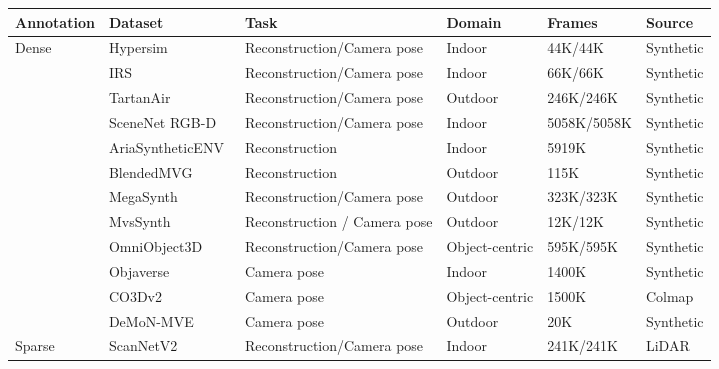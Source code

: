 \begin{table}[htbp]
  \centering
  \small
  \renewcommand{\arraystretch}{0.88}
  \setlength{\tabcolsep}{6pt}
    \begin{tabular}{l|l|l|l|l|l}
      \toprule
      Annotation & Dataset & Task & Domain & Frames & Source \\
      \midrule
      \multirow{12}{*}{Dense}
        & Hypersim~\cite{roberts2021hypersimphotorealisticsyntheticdataset}        & Reconstruction/Camera pose & Indoor  & 44K/44K  & Synthetic  \\
        & IRS~\cite{wang2021irslargenaturalisticindoor}             & Reconstruction/Camera pose & Indoor  & 66K/66K & Synthetic \\
        & TartanAir~\cite{wang2020tartanairdatasetpushlimits}       & Reconstruction/Camera pose & Outdoor  & 246K/246K  & Synthetic \\
        & SceneNet RGB-D~\cite{mccormac2017scenenetrgbd5mphotorealistic}  & Reconstruction/Camera pose & Indoor  & 5058K/5058K & Synthetic  \\
        & AriaSyntheticENV~\cite{avetisyan2024scenescriptreconstructingscenesautoregressive} & Reconstruction            & Indoor  & 5919K & Synthetic  \\
        & BlendedMVG~\cite{yao2020blendedmvslargescaledatasetgeneralized}      & Reconstruction             & Outdoor  & 115K & Synthetic \\
        & MegaSynth~\cite{jiang2025megasynthscaling3dscene}       & Reconstruction/Camera pose & Outdoor  & 323K/323K & Synthetic \\
        & MvsSynth~\cite{DeepMVS}        & Reconstruction / Camera pose & Outdoor  & 12K/12K & Synthetic \\
        & OmniObject3D~\cite{wu2023omniobject3dlargevocabulary3dobject}      & Reconstruction/Camera pose & Object-centric  & 595K/595K  & Synthetic \\
        & Objaverse~\cite{deitke2022objaverseuniverseannotated3d}       & Camera pose       & Indoor  & 1400K  & Synthetic \\
        & CO3Dv2~\cite{reizenstein2021commonobjects3dlargescale}          & Camera pose       & Object-centric  & 1500K  & Colmap \\
        & DeMoN-MVE~\cite{Ummenhofer_2017}       & Camera pose       & Outdoor  & 20K  & Synthetic \\
      \midrule
      \multirow{4}{*}{Sparse}
        & ScanNetV2~\cite{dai2017scannetrichlyannotated3dreconstructions} & Reconstruction/Camera pose & Indoor  & 241K/241K & LiDAR \\

\end{tabular}
\end{table}
